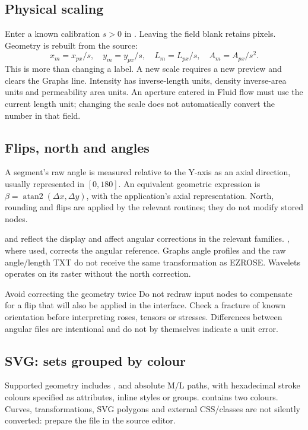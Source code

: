 \subsection{Physical scaling}
Enter a known calibration \(s>0\) in . Leaving the field blank retains pixels. Geometry is rebuilt from the source:
\begin{equation}
 x_m=x_{px}/s,\quad y_m=y_{px}/s,\quad
 L_m=L_{px}/s,\quad A_m=A_{px}/s^2.
\end{equation}
This is more than changing a label. A new scale requires a new preview and clears the Graphs line. Intensity has inverse-length units, density inverse-area units and permeability area units. An aperture entered in Fluid flow must use the current length unit; changing the scale does not automatically convert the number in that field.

\subsection{Flips, north and angles}
A segment's raw angle is measured relative to the Y-axis as an axial direction, usually represented in \([0,180]\). An equivalent geometric expression is \(\beta=\operatorname{atan2}(\Delta x,\Delta y)\), with the application's axial representation. North, rounding and flips are applied by the relevant routines; they do not modify stored nodes.

 and  reflect the display and affect angular corrections in the relevant families. , where used, corrects the angular reference. Graphs angle profiles and the raw angle/length TXT do not receive the same transformation as EZROSE. Wavelets operates on its raster without the north correction.

\begin{note}{Avoid correcting the geometry twice}
Do not redraw input nodes to compensate for a flip that will also be applied in the interface. Check a fracture of known orientation before interpreting roses, tensors or stresses. Differences between angular files are intentional and do not by themselves indicate a unit error.
\end{note}

\subsection{SVG: sets grouped by colour}
Supported geometry includes ,  and absolute M/L paths, with hexadecimal stroke colours specified as attributes, inline styles or groups.  contains two colours. Curves, transformations, SVG polygons and external CSS/classes are not silently converted: prepare the file in the source editor.

